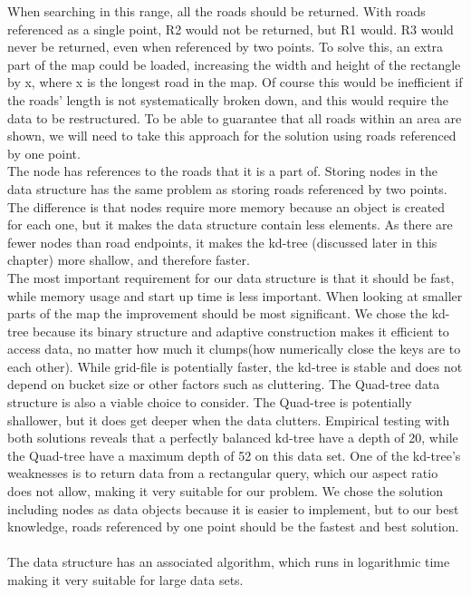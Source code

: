 \documentclass[a4paper,10pt,titlepage]{article}
\begin{document}
 When searching in this range, all the roads should be returned. With roads referenced as a single point, R2 would not be returned, but R1 would. R3 would never be returned, even when referenced by two points. To solve this, an extra part of the map could be loaded, increasing the width and height of the rectangle by x, where x is the longest road in the map. Of course this would be inefficient if the roads' length is not systematically broken down, and this would require the data to be restructured. To be able to guarantee that all roads within an area are shown, we will need to take this approach for the solution using roads referenced by one point.\\
The node has references to the roads that it is a part of. Storing nodes in the data structure has the same problem as storing roads referenced by two points. The difference is that nodes require more memory because an object is created for each one, but it makes the data structure contain less elements. As there are fewer nodes than road endpoints, it makes the kd-tree (discussed later in this chapter) more shallow, and therefore faster.\\
The most important requirement for our data structure is that it should be fast, while memory usage and start up time is less important. When looking at smaller parts of the map the improvement should be most significant. We chose the kd-tree because its binary structure and adaptive construction makes it efficient to access data, no matter how much it clumps(how numerically close the keys are to each other). While grid-file is potentially faster, the kd-tree is stable and does not depend on bucket size or other factors such as cluttering.  The Quad-tree data structure is also a viable choice to consider. The Quad-tree is potentially shallower, but it does get deeper when the data clutters. Empirical testing with both solutions reveals that a perfectly balanced kd-tree have a depth of 20, while the Quad-tree have a maximum depth of 52 on this data set. One of the kd-tree’s weaknesses is to return data from a rectangular query, which our aspect ratio does not allow, making it very suitable for our problem. We chose the solution including nodes as data objects because it is easier to implement, but to our best knowledge, roads referenced by one point should be the fastest and best solution.\\
\\
The data structure has an associated algorithm, which runs in logarithmic time making it very suitable for large data sets.\\
\end{document}
